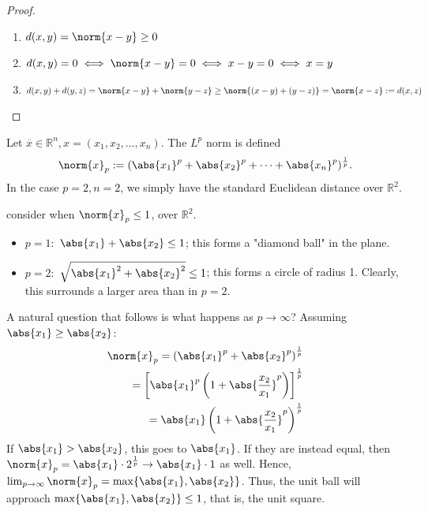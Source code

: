 \begin{proof}
    \begin{enumerate}
        \item $d(x,y) = \norm{x - y} \geq 0$
        \item $d(x, y) = 0 \iff \norm{x - y} = 0 \iff x - y = 0 \iff x = y$
        \item $d(x, y) + d(y, z) = \norm{x - y} + \norm{y - z} \geq \norm{(x - y) + (y-z)} = \norm{x - z} := d(x, z)$
    \end{enumerate}
\end{proof}

\begin{example}
    Let $\overline{x} \in \mathbb{R}^n, x = (x_1, x_2, \dots, x_n)$. The $L^p$ norm is defined \[
    \norm{x}_p := (\abs{x_1}^p + \abs{x_2}^p + \cdots + \abs{x_n}^p)^{\frac{1}{p}}.    
    \]
    In the case $p = 2, n = 2$, we simply have the standard Euclidean distance over $\mathbb{R}^2$.

     consider when $\norm{x}_p \leq 1$, over $\mathbb{R}^2$.
    \begin{itemize}
        \item $p = 1:$ $\abs{x_1} + \abs{x_2} \leq 1$; this forms a "diamond ball" in the plane.
        \item $p = 2:$ $\sqrt{\abs{x_1}^{2}+\abs{x_2}^2} \leq 1$; this forms a circle of radius 1. Clearly, this surrounds a larger area than in $p =2$.
    \end{itemize}
    A natural question that follows is what happens as $p \to \infty$? Assuming $\abs{x_1} \geq \abs{x_2}$:
    \begin{align*}
        \norm{x}_p = \left(\abs{x_1}^p + \abs{x_2}^p\right)^{\frac{1}{p}}\\
        = \left[\abs{x_1}^p\left(1 + \abs{\frac{x_2}{x_1}}^p\right)\right]^{\frac{1}{p}}\\
        = \abs{x_1}\left(1 + \abs{\frac{x_2}{x_1}}^p\right)^{\frac{1}{p}}
    \end{align*}
    If $\abs{x_1} > \abs{x_2}$, this goes to $\abs{x_1}$. If they are instead equal, then $\norm{x}_p = \abs{x_1}\cdot 2^{\frac{1}{p}} \to \abs{x_1} \cdot 1$ as well. Hence, $\lim_{p \to \infty} \norm{x}_p = \max\{\abs{x_1}, \abs{x_2}\}$. Thus, the unit ball will approach $\max \{\abs{x_1}, \abs{x_2}\} \leq 1$, that is, the unit square.
\end{example}
